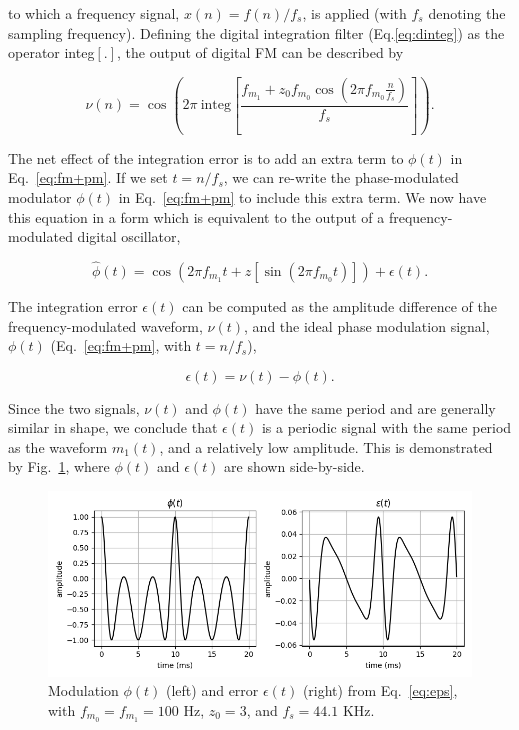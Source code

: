 \documentclass[]{interact}
\begin{document}
\noindent to which a frequency signal, $x(n) = f(n)/f_s$, is applied (with $f_s$ denoting the sampling frequency). Defining the
digital integration filter (Eq.\ref{eq:dinteg}) as the operator integ$[.]$, the output of digital FM can be described by

\begin{equation}
\nu(n) = \cos\left(2\pi\:\textrm{integ}\left [\frac {f_{m_1} + z_0 f_{m_0} \cos\left(2\pi f_{m_0} \frac n {f_s}\right)} {f_s} \right] \right).
\end{equation}
\smallskip

The net effect of the integration error is to add an extra term to $\phi(t)$ in Eq.~\ref{eq:fm+pm}. If we set $t = n/f_s$,
we can re-write the phase-modulated modulator $\phi(t)$ in Eq.~\ref{eq:fm+pm} to include this extra term. We now
have this equation in a form which is equivalent to the output of a frequency-modulated digital oscillator, 

\begin{equation}
\hat{\phi}(t) = \cos(2\pi f_{m_1} t + z [\sin(2\pi f_{m_0} t)]) + \epsilon(t). 
\end{equation}
\smallskip

The integration error $\epsilon(t)$ can be computed as the amplitude difference of 
the frequency-modulated waveform, $\nu(t)$, and the ideal phase modulation signal, 
$\phi(t)$ (Eq.~\ref{eq:fm+pm}, with $t = n/f_s$),

\begin{equation}\label{eq:eps}
\epsilon(t) = \nu(t) - \phi(t).
\end{equation}
\smallskip

Since the two signals, $\nu(t)$ and $\phi(t)$ have the same period and are generally similar 
in shape, we conclude that $\epsilon(t)$  is a periodic signal with the same period as the waveform 
$m_1(t)$, and a relatively low amplitude. This is demonstrated by Fig.~\ref{fig:epsilon}, where
$\phi(t)$ and $\epsilon(t)$ are shown side-by-side. 

\begin{figure}[htp]
\begin{center}
\includegraphics[width=0.8\columnwidth]{epsilon.png}
\caption{Modulation $\phi(t)$ (left) and error $\epsilon(t)$ (right) from Eq.~\ref{eq:eps},  with $f_{m_0} = f_{m_1} = 100$ Hz, $z_0=3$, and $f_s = 44.1$ KHz.}
\label{fig:epsilon}
\end{center}
\end{figure} 
\end{document}

